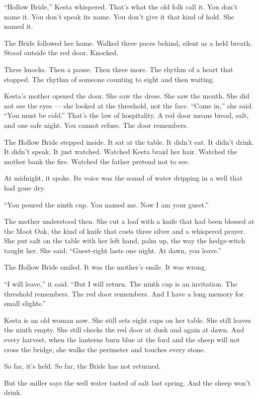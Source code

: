 ``Hollow Bride,'' Kesta whispered. That's what the old folk call it. You don't name it. You don't speak its name. You don't give it that kind of hold. She named it.

The Bride followed her home. Walked three paces behind, silent as a held breath. Stood outside the red door. Knocked.

Three knocks. Then a pause. Then three more. The rhythm of a heart that stopped. The rhythm of someone counting to eight and then waiting.

Kesta's mother opened the door. She saw the dress. She saw the mouth. She did not see the eyes --- she looked at the threshold, not the face. ``Come in,'' she said. ``You must be cold.'' That's the law of hospitality. A red door means bread, salt, and one safe night. You cannot refuse. The door remembers.

The Hollow Bride stepped inside. It sat at the table. It didn't eat. It didn't drink. It didn't speak. It just watched. Watched Kesta braid her hair. Watched the mother bank the fire. Watched the father pretend not to see.

At midnight, it spoke. Its voice was the sound of water dripping in a well that had gone dry.

``You poured the ninth cup. You named me. Now I am your guest.''

The mother understood then. She cut a loaf with a knife that had been blessed at the Moot Oak, the kind of knife that costs three silver and a whispered prayer. She put salt on the table with her left hand, palm up, the way the hedge-witch taught her. She said: ``Guest-right lasts one night. At dawn, you leave.''

The Hollow Bride smiled. It was the mother's smile. It was wrong.

``I will leave,'' it said. ``But I will return. The ninth cup is an invitation. The threshold remembers. The red door remembers. And I have a long memory for small slights.''

Kesta is an old woman now. She still sets eight cups on her table. She still leaves the ninth empty. She still checks the red door at dusk and again at dawn. And every harvest, when the lanterns burn blue at the ford and the sheep will not cross the bridge, she walks the perimeter and touches every stone.

So far, it's held. So far, the Bride has not returned.

But the miller says the well water tasted of salt last spring. And the sheep won't drink.


